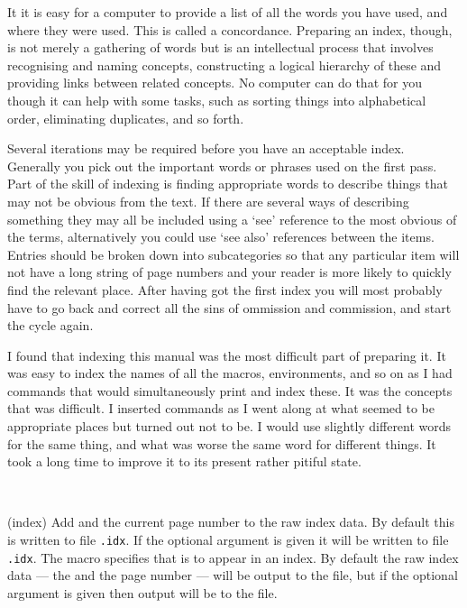 
    It it is easy for a computer to provide a list of all the words you
have used, and where they were used. This is called a 
concordance. 
Preparing an index, though, is not merely a gathering of words but 
is an intellectual
process that involves recognising and naming concepts, constructing a
logical hierarchy of these and providing links between related concepts.
No computer can do that for you though it can help with some tasks, such as
sorting things into alphabetical order, eliminating duplicates, and so forth.

    Several iterations may be required before you have an acceptable index.
Generally you pick out the important words or phrases used on the first pass.
Part of the skill of indexing is finding appropriate words to describe things
that may not be obvious from the text. If there are several ways of describing
something they may all be included using a `see' 
reference to the most
obvious of the terms, alternatively you could 
use `see also' references
between the items. Entries should be broken down into subcategories so
that any particular item will not have a long string of page numbers and
your reader is more likely to quickly find the relevant place. After having 
got the first index you will most probably have to go back and correct
all the sins of ommission and commission, and start the cycle again.

    I found that indexing this manual was the most difficult part of preparing
it. It was easy to index the names of all the macros, environments, and so on
as I had commands that would simultaneously print and index these. It was
the concepts that was difficult. I inserted \cmd{\index} commands as I went
along at what seemed to be appropriate places but turned out not to be.
I would use slightly different words for the same thing, and what was worse
the same word for different things. It took a long time to improve it to 
its present rather pitiful state.

\begin{syntax}
\cmd{\index} \\
\end{syntax}
\glossary(index)%
  {}%
  {Add  and the current page number to the raw index data. 
   By default this is written to
   file \texttt{.idx}. If the optional argument
   is given it will be written to file \texttt{.idx}.}
The \cmd{\index} macro specifies that  is to appear in
an index. By default the raw index data --- the  and the 
page number --- will be output
to the  file, but if the optional 
argument is given then output will be to the  file.

